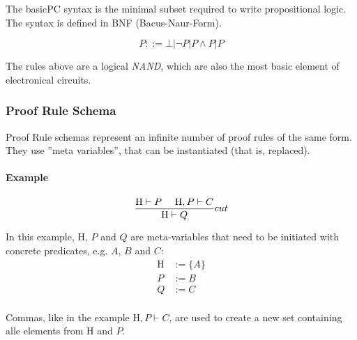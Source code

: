 The basicPC syntax is the minimal subset required to write propositional logic. The syntax is defined in BNF (Bacus-Naur-Form).

\[
	P ::= \bot | \neg P | P \land P | P
\]

The rules above are a logical \emph{NAND}, which are also the most basic element of electronical circuits.

\subsubsection{Proof Rule Schema}

Proof Rule schemas represent an infinite number of proof rules of the same form. They use ''meta variables'', that can be instantiated (that is, replaced).

\paragraph{Example} 
\[
	\frac{
		\text{H} \vdash P \text{ }\text{ }\text{ }\text{ } \text{H}, P \vdash C
	 }{
		\text{H} \vdash Q
	} cut
\]

In this example, H, $P$ and $Q$ are meta-variables that need to be initiated with concrete predicates, e.g. $A$, $B$ and $C$: \begin{align*}
  \text{H} &:= \{A\} \\
	P &:= B \\
	Q &:= C \\
\end{align*}

Commas, like in the example $\text{H}, P \vdash C$, are used to create a new set containing alle elements from H and $P$.

